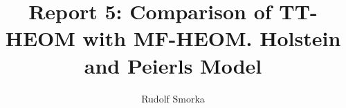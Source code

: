 \documentclass{article}
\renewcommand{\vec}[1]{\mathbf{#1}}
\begin{document}
	
\title{Report 5: Comparison of TT-HEOM with MF-HEOM. Holstein and Peierls Model}
\author{Rudolf Smorka}
\maketitle
\end{document}

